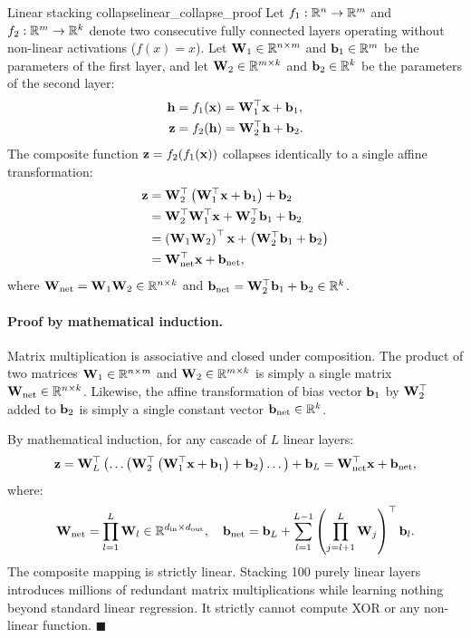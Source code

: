 \documentclass[../../main.tex]{subfiles}
\begin{document}
\begin{theorem}{Linear stacking collapse}{linear_collapse_proof}
Let $f_1: \mathbb{R}^n \to \mathbb{R}^m$ and $f_2: \mathbb{R}^m \to \mathbb{R}^k$ denote two consecutive fully connected layers operating without non-linear activations ($f(x) = x$). Let $\mathbf{W}_1 \in \mathbb{R}^{n \times m}$ and $\mathbf{b}_1 \in \mathbb{R}^m$ be the parameters of the first layer, and let $\mathbf{W}_2 \in \mathbb{R}^{m \times k}$ and $\mathbf{b}_2 \in \mathbb{R}^k$ be the parameters of the second layer:
\begin{align}
\mathbf{h} &= f_1(\mathbf{x}) = \mathbf{W}_1^\top \mathbf{x} + \mathbf{b}_1, \label{eq:collapse_layer1} \\
\mathbf{z} &= f_2(\mathbf{h}) = \mathbf{W}_2^\top \mathbf{h} + \mathbf{b}_2. \label{eq:collapse_layer2}
\end{align}
The composite function $\mathbf{z} = f_2(f_1(\mathbf{x}))$ collapses identically to a single affine transformation:
\begin{align}
\mathbf{z} &= \mathbf{W}_2^\top \left( \mathbf{W}_1^\top \mathbf{x} + \mathbf{b}_1 \right) + \mathbf{b}_2 \notag \\
&= \mathbf{W}_2^\top \mathbf{W}_1^\top \mathbf{x} + \mathbf{W}_2^\top \mathbf{b}_1 + \mathbf{b}_2 \notag \\
&= \left( \mathbf{W}_1 \mathbf{W}_2 \right)^\top \mathbf{x} + \left( \mathbf{W}_2^\top \mathbf{b}_1 + \mathbf{b}_2 \right) \notag \\
&= \mathbf{W}_{\text{net}}^\top \mathbf{x} + \mathbf{b}_{\text{net}}, \label{eq:collapse_final}
\end{align}
where $\mathbf{W}_{\text{net}} = \mathbf{W}_1 \mathbf{W}_2 \in \mathbb{R}^{n \times k}$ and $\mathbf{b}_{\text{net}} = \mathbf{W}_2^\top \mathbf{b}_1 + \mathbf{b}_2 \in \mathbb{R}^k$.
\end{theorem}

\paragraph{Proof by mathematical induction.}
Matrix multiplication is associative and closed under composition. The product of two matrices $\mathbf{W}_1 \in \mathbb{R}^{n \times m}$ and $\mathbf{W}_2 \in \mathbb{R}^{m \times k}$ is simply a single matrix $\mathbf{W}_{\text{net}} \in \mathbb{R}^{n \times k}$. Likewise, the affine transformation of bias vector $\mathbf{b}_1$ by $\mathbf{W}_2^\top$ added to $\mathbf{b}_2$ is simply a single constant vector $\mathbf{b}_{\text{net}} \in \mathbb{R}^k$. 

By mathematical induction, for any cascade of $L$ linear layers:
\begin{equation}
\label{eq:induction_collapse}
\mathbf{z} = \mathbf{W}_L^\top \left( \dots \left( \mathbf{W}_2^\top \left( \mathbf{W}_1^\top \mathbf{x} + \mathbf{b}_1 \right) + \mathbf{b}_2 \right) \dots \right) + \mathbf{b}_L = \mathbf{W}_{\text{net}}^\top \mathbf{x} + \mathbf{b}_{\text{net}},
\end{equation}
where:
\begin{equation}
\mathbf{W}_{\text{net}} = \prod_{l=1}^L \mathbf{W}_l \in \mathbb{R}^{d_{\text{in}} \times d_{\text{out}}}, \quad \mathbf{b}_{\text{net}} = \mathbf{b}_L + \sum_{l=1}^{L-1} \left( \prod_{j=l+1}^L \mathbf{W}_j \right)^\top \mathbf{b}_l.
\end{equation}
The composite mapping is strictly linear. Stacking 100 purely linear layers introduces millions of redundant matrix multiplications while learning nothing beyond standard linear regression. It strictly cannot compute XOR or any non-linear function. \hfill $\blacksquare$
\end{document}
